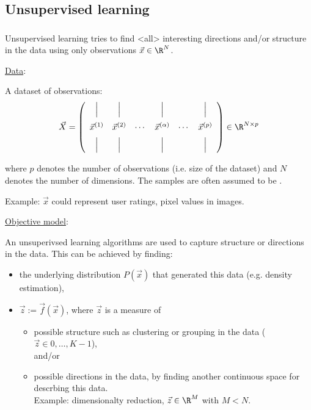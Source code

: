 \subsection{Unsupervised learning} \label{sec:unsupervised}

\begin{frame}\frametitle{\subsecname}

Unsupervised learning tries to find 
\mode<all>
 interesting directions and/or structure in the data using only observations $\vec x \in \R^N$.

\underline{Data}:

A dataset of observations:
\begin{equation}
\label{eq:observations}
\vec X = 
\left(
\begin{array}{cccccc}
\Big| & \Big| & & \Big| & & \Big| \\[3mm]
\vec x^{(1)} & \vec x^{(2)} & \cdots & \vec x^{(\alpha)} & \cdots & \vec x^{(p)}\\[2mm]
\Big| & \Big| & & \Big| & & \Big|
\end{array}
\right) \in \R^{N \times p}
\end{equation}

where $p$ denotes the number of observations (i.e. size of the dataset) and $N$ denotes the number of dimensions.
The samples are often assumed to be \iid.

Example: $\vec x$ could represent user ratings, pixel values in images.

\end{frame}
\begin{frame}

\underline{Objective model}:

An unsuperivsed learning algorithms are used to capture structure or directions in the data. This can be achieved by finding:
\begin{itemize}
\item the underlying distribution $P(\vec x)$ that generated this data (e.g. density estimation),
\item $\vec z := \vec f(\vec x)$, where $\vec z$ is a measure of 
\begin{itemize}
\item possible structure such as clustering or grouping in the data ($\vec z \in {0,\ldots,K-1}$), \\

and/or

\item possible directions in the data, by finding another continuous space for descrbing this data. \\

Example: dimensionalty reduction, $\vec z \in \R^M$ with $M < N$.

\end{itemize}
\end{itemize}

\end{frame}

